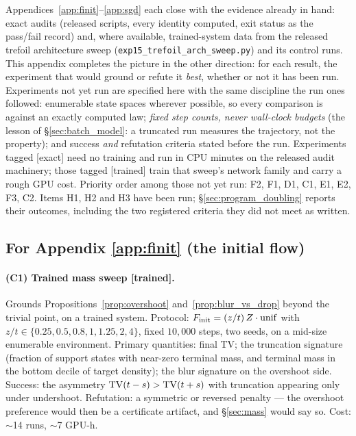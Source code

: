 \section{\appendixGtitle}\label{app:program}

Appendices~\ref{app:finit}--\ref{app:sgd} each close with the evidence already in hand:
exact audits (released scripts, every identity computed, exit status as the pass/fail
record) and, where available, trained-system data from the released trefoil
architecture sweep (\texttt{exp15\_trefoil\_arch\_sweep.py}) and its control runs.
This appendix completes the picture in the other direction: for each result, the
experiment that would ground or refute it \emph{best}, whether or not it has been run.
Experiments not yet run are specified here with the same discipline the run ones
followed: enumerable state spaces wherever possible, so every comparison is against an
exactly computed law; \emph{fixed step counts, never wall-clock budgets} (the lesson of
\S\ref{sec:batch_model}: a truncated run measures the trajectory, not the property);
and success \emph{and} refutation criteria stated before the run. Experiments tagged
[exact] need no training and run in CPU minutes on the released audit machinery; those
tagged [trained] train that sweep's network family and carry a rough GPU cost.
Priority order among those not yet run: F2, F1, D1, C1, E1, E2, F3, C2.
Items H1, H2 and H3 have been run; \S\ref{sec:program_doubling} reports their outcomes,
including the two registered criteria they did not meet as written.

\subsection{For Appendix \ref{app:finit} (the initial flow)}

\paragraph{(C1) Trained mass sweep [trained].}
Grounds Propositions~\ref{prop:overshoot} and~\ref{prop:blur_vs_drop} beyond the trivial
point, on a trained system. Protocol: $F_{\mathrm{init}}=(z/t)\,Z\cdot\mathrm{unif}$ with
$z/t\in\{0.25, 0.5, 0.8, 1, 1.25, 2, 4\}$, fixed $10{,}000$ steps, two seeds, on a
mid-size enumerable environment. Primary quantities: final TV; the truncation signature
(fraction of support states with near-zero terminal mass, and terminal mass in the
bottom decile of target density); the blur signature on the overshoot side. Success: the
asymmetry $\mathrm{TV}(t-s)>\mathrm{TV}(t+s)$ with truncation appearing only under undershoot.
Refutation: a symmetric or reversed penalty --- the overshoot preference would then be a
certificate artifact, and \S\ref{sec:mass} would say so. Cost: $\sim$14 runs,
$\sim$7 GPU-h.

